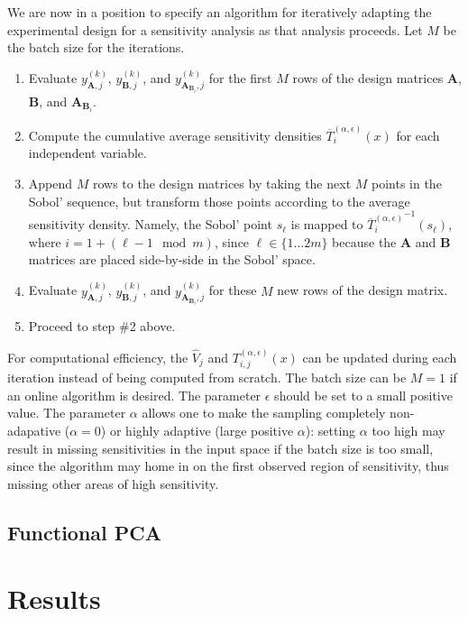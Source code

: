 \documentclass[12pt]{article}
\begin{document}
We are now in a position to specify an algorithm for iteratively adapting the experimental design for a sensitivity analysis as that analysis proceeds. Let $M$ be the batch size for the iterations.
\begin{enumerate}
    \item Evaluate $y_{\mathbf{A},j}^{(k)}$, $y_{\mathbf{B},j}^{(k)}$, and $y_{\mathbf{A}_{\mathbf{B}_i},j}^{(k)}$ for the first $M$ rows of the design matrices $\mathbf{A}$, $\mathbf{B}$, and $\mathbf{A}_{\mathbf{B}_i}$.
    \item Compute the cumulative average sensitivity densities $\overline{T}_i^{(\alpha,\epsilon)}(x)$ for each independent variable.
    \item Append $M$ rows to the design matrices by taking the next $M$ points in the Sobol' sequence, but transform those points according to the average sensitivity density. Namely, the Sobol' point $s_\ell$ is mapped to ${\overline{T}_i^{(\alpha,\epsilon)}}^{-1}(s_\ell)$, where $i = 1 + (\ell - 1 \mod m)$, since $\ell \in \{ 1 \ldots 2 m \}$ because the $\mathbf{A}$ and $\mathbf{B}$ matrices are placed side-by-side in the Sobol' space.
    \item Evaluate $y_{\mathbf{A},j}^{(k)}$, $y_{\mathbf{B},j}^{(k)}$, and $y_{\mathbf{A}_{\mathbf{B}_i},j}^{(k)}$ for these $M$ new rows of the design matrix.
    \item Proceed to step \#2 above.
\end{enumerate}
For computational efficiency, the $\hat{V}_j$ and $T_{i,j}^{(\alpha,\epsilon)}(x)$ can be updated during each iteration instead of being computed from scratch. The batch size can be $M = 1$ if an online algorithm is desired. The parameter $\epsilon$ should be set to a small positive value. The parameter $\alpha$ allows one to make the sampling completely non-adapative ($\alpha = 0$) or highly adaptive (large positive $\alpha$): setting $\alpha$ too high may result in missing sensitivities in the input space if the batch size is too small, since the algorithm may home in on the first observed region of sensitivity, thus missing other areas of high sensitivity.


\subsection{Functional PCA}



\section{Results}
\end{document}
